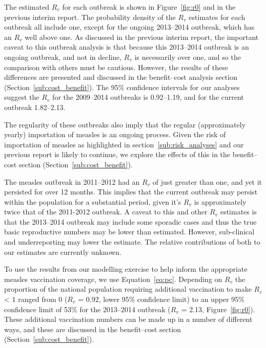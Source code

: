 \documentclass{article}
\begin{document}
The estimated $R_v$ for each outbreak is shown in Figure~\ref{fig:r0} and in the previous interim report. The probability density of the $R_v$ estimates for each outbreak all include one, except for the ongoing 2013--2014 outbreak, which has an $R_v$ well above one. As discussed in the previous interim report, the important caveat to this outbreak analysis is that because this 2013--2014 outbreak is an ongoing outbreak, and not in decline, $R_v$ is necessarily over one, and so the comparison with others must be cautious. However, the results of these differences are presented and discussed in the benefit--cost analysis section (Section~\ref{sub:cost_benefit}). The 95\% confidence intervals for our analyses suggest the $R_v$ for the 2009--2014 outbreaks is 0.92--1.19, and for the current outbreak 1.82--2.13.

The regularity of these outbreaks also imply that the regular (approximately yearly) importation of measles is an ongoing process. Given the risk of importation of measles as highlighted in section~\ref{sub:risk_analyses} and our previous report is likely to continue, we explore the effects of this in the benefit--cost section (Section~\ref{sub:cost_benefit}).

The measles outbreak in 2011--2012 had an $R_v$ of just greater than one, and yet it persisted for over 12 months. This implies that the current outbreak may persist within the population for a substantial period, given it's $R_v$ is approximately twice that of the 2011-2012 outbreak. A caveat to this and other $R_v$ estimates is that the 2013--2014 outbreak may include some sporadic cases and thus the true basic reproductive numbers may be lower than estimated. However, sub-clinical and underreporting may lower the estimate. The relative contributions of both to our estimates are currently unknown.

To use the results from our modelling exercise to help inform the appropriate measles vaccination coverage, we use Equation~\ref{eq:pc}. Depending on $R_v$ the proportion of the national population requiring additional vaccination to make $R_v$ < 1 ranged from 0 ($R_v$ = 0.92, lower 95\% confidence limit) to an upper 95\% confidence limit of 53\% for the 2013--2014 outbreak ($R_v$ = 2.13, Figure~\ref{fig:r0}). These additional vaccination numbers can be made up in a number of different ways, and these are discussed in the benefit--cost section (Section~\ref{sub:cost_benefit}).
\end{document}
